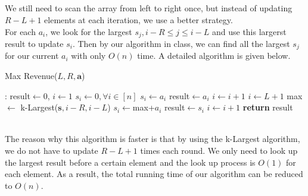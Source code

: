 \documentclass[12pt,letterpaper]{article}
\begin{document}
\subsection{}
We still need to scan the array from left to right once,
but instead of updating $R-L+1$ elements at each iteration,
we use a better strategy.\\
For each $a_i$,
we look for the largest $s_j,i-R\leq j\leq i-L$
and use this largerst result to update $s_i$.
Then by our algorithm in class,
we can find all the largest $s_j$ for our current $a_i$ with only $O(n)$ time.
A detailed algorithm is given below.
\begin{algorithm}
  \caption{Max Revenue($L,R,\boldsymbol{a}$)}\label{alg:mrlrn}
  \begin{algorithmic}[1]
  :
  \State result$\gets0$, $i\gets1$ $s_i\gets 0,\forall i\in[n]$ 
  \State $s_i\gets a_i$
  \EndIf
  \State result$\gets a_i$
  \EndIf
  \State $i\gets i+1$
  \EndWhile
  \State $i\gets L+1$
  \State max$\gets$ k-Largest($\boldsymbol{s},i-R,i-L$)
  \State $s_i\gets$max+$a_i$
  \EndIf
  \State result$\gets s_i$
  \EndIf
  \State $i\gets i+1$
  \EndWhile
  \State \textbf{return} result
  \EndProcedure
  \end{algorithmic}
\end{algorithm}\\
The reason why this algorithm is faster is that
by using the k-Largest algorithm, 
we do not have to update $R-L+1$ times each round.
We only need to look up the largest result before a certain element 
and the look up process is $O(1)$ for each element.
As a result, the total running time of our algorithm can be reduced to $O(n)$.
\end{document}
